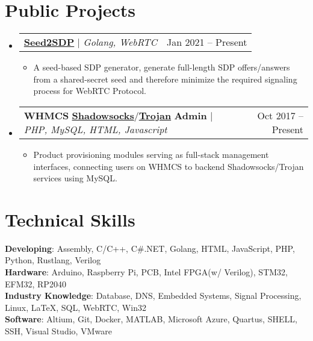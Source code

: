 \documentclass[letterpaper,11pt]{article}
\makeatletter
\newcommand{\resumeItem}[1]{
  \item\small{
    {#1 \vspace{-2pt}}
  }
}
\newcommand{\resumeProjectHeading}[2]{
    \item
    \begin{tabular*}{0.97\textwidth}{l@{\extracolsep{\fill}}r}
      \small#1 & #2 \\
    \end{tabular*}\vspace{-7pt}
}
\newcommand{\resumeSubHeadingListStart}{\begin{itemize}[leftmargin=0.15in, label={}]}
\newcommand{\resumeSubHeadingListEnd}{\end{itemize}}
\newcommand{\resumeItemListStart}{\begin{itemize}}
\newcommand{\resumeItemListEnd}{\end{itemize}\vspace{-5pt}}
\makeatother
\begin{document}


\section{Public Projects}
    \resumeSubHeadingListStart

      \resumeProjectHeading
        {\href{https://github.com/Gaukas/seed2sdp}{\textbf{Seed2SDP}} $|$ \emph{Golang, WebRTC}}{Jan 2021 -- Present}
        \resumeItemListStart
        \resumeItem{A seed-based SDP generator, generate full-length SDP offers/answers from a shared-secret seed and therefore minimize the required signaling process for WebRTC Protocol.}
        \resumeItemListEnd

      \resumeProjectHeading
        {\textbf{WHMCS} \href{https://github.com/NETOUCHER/WHMCS_Shadowsocks_Admin}{\textbf{Shadowsocks}}/\href{https://github.com/NETOUCHER/WHMCS_Trojan_Admin}{\textbf{Trojan}} \textbf{Admin} $|$ \emph{PHP, MySQL, HTML, Javascript}}{Oct 2017 -- Present}
        \resumeItemListStart
        \resumeItem{Product provisioning modules serving as full-stack management interfaces, connecting users on WHMCS to backend Shadowsocks/Trojan services using MySQL.}
        \resumeItemListEnd
      
    \resumeSubHeadingListEnd

  \vspace{1pt}

%
\section{Technical Skills}
 \begin{itemize}[leftmargin=0.15in, label={}]
    \small{\item{
     \textbf{Developing}{: Assembly, C/C++, C\#.NET, Golang, HTML, JavaScript, PHP, Python, Rustlang, Verilog} \\
     \textbf{Hardware}{: Arduino, Raspberry Pi, PCB, Intel FPGA(w/ Verilog), STM32, EFM32, RP2040} \\
     \textbf{Industry Knowledge}{: Database, DNS, Embedded Systems, Signal Processing, Linux, \LaTeX, SQL, WebRTC, Win32} \\
     \textbf{Software}{: Altium, Git, Docker, MATLAB, Microsoft Azure, Quartus, SHELL, SSH, Visual Studio, VMware}
    }}
 \end{itemize}
\end{document}
